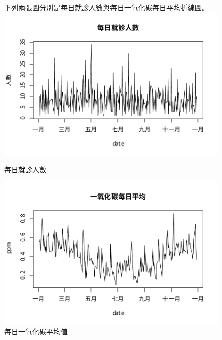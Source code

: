 \documentclass[a4paper, 12pt]{article}
\begin{document}
\begin{figure}
下列兩張圖分別是每日就診人數與每日一氧化碳每日平均折線圖。
       \includegraphics[width=13cm]{patient.pdf}
       \caption{\label{}每日就診人數}
       \includegraphics[width=13cm]{CO.pdf}
       \caption{\label{}每日一氧化碳平均值}
\end{figure}
\clearpage
\end{document}
